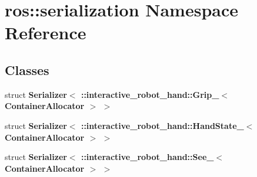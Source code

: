 \section{ros\-:\-:serialization Namespace Reference}
\label{namespaceros_1_1serialization}
\subsection*{Classes}
\begin{DoxyCompactItemize}
\item 
struct {\bf Serializer$<$ \-::interactive\-\_\-robot\-\_\-hand\-::\-Grip\-\_\-$<$ Container\-Allocator $>$ $>$}
\item 
struct {\bf Serializer$<$ \-::interactive\-\_\-robot\-\_\-hand\-::\-Hand\-State\-\_\-$<$ Container\-Allocator $>$ $>$}
\item 
struct {\bf Serializer$<$ \-::interactive\-\_\-robot\-\_\-hand\-::\-See\-\_\-$<$ Container\-Allocator $>$ $>$}
\end{DoxyCompactItemize}
